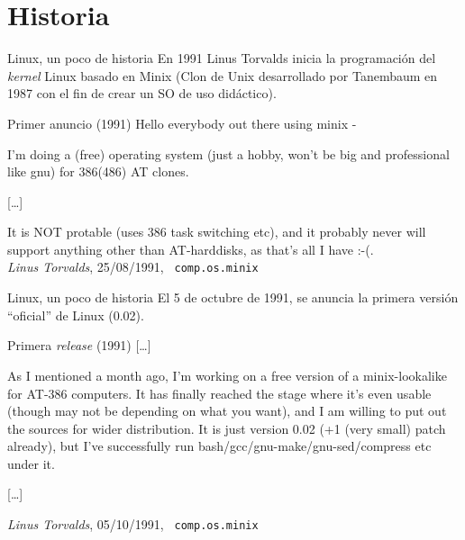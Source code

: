 \section{Historia}
\begin{frame}{Linux, un poco de historia}
  En 1991 Linus Torvalds inicia la programación del \textit{kernel} Linux
  basado en Minix\cite{Minix} (Clon de Unix desarrollado por Tanembaum en
  1987 con el fin de crear un SO de uso didáctico).

\begin{block}{Primer anuncio \hfill (1991)}\small
  \noindent Hello everybody out there using minix - 
 
  I’m doing a (free) operating system (just a hobby, won’t be big and
  professional like gnu) for 386(486) AT clones.

  [\ldots]
  
  It is \alert{NOT protable} (uses 386 task switching etc), and it probably never
  will support anything other than AT-harddisks, as that’s all I have :-(.\\
  
  \hfill \emph{Linus Torvalds}, 25/08/1991, \texttt{\small
    comp.os.minix\cite{Torvalds1992}}
\end{block}

\end{frame}

\begin{frame}{Linux, un poco de historia}
El 5 de octubre de 1991, se anuncia la primera versión ``oficial'' de
Linux (0.02).

\begin{block}{Primera \textit{release} \hfill (1991)}
  [\ldots]

  As I mentioned a month ago, I'm working on a free version of a
  minix-lookalike for AT-386 computers. It has finally reached the stage
  where it's even usable (though may not be depending on what you want),
  and I am willing to put out the sources for wider distribution. It is
  just version 0.02 (+1 (very small) patch already), but I've successfully
  run bash/gcc/gnu-make/gnu-sed/compress etc under it.

  [\ldots]

  \hfill \emph{Linus Torvalds}, 05/10/1991, \texttt{\small
    comp.os.minix\cite{Torvalds1992}}

\end{block}
\end{frame}

